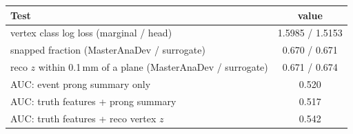 \begin{tabular}{lc}
\toprule
Test & value \\
\midrule
vertex class log loss (marginal / head) & 1.5985 / 1.5153 \\
snapped fraction (MasterAnaDev / surrogate) & 0.670 / 0.671 \\
reco $z$ within 0.1\,mm of a plane (MasterAnaDev / surrogate) & 0.671 / 0.674 \\
\midrule
AUC: event prong summary only & 0.520 \\
AUC: truth features + prong summary & 0.517 \\
AUC: truth features + reco vertex $z$ & 0.542 \\
\bottomrule
\end{tabular}
